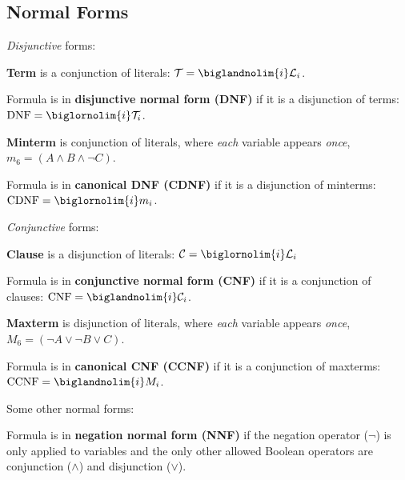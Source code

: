 \documentclass[a4paper,10pt]{article}
\begin{document}
\endgroup


\newpage
\subsection{Normal Forms}

\begin{terms}
    \item \emph{Disjunctive} forms:
    \begin{terms}
        \item \textbf{Term} is a conjunction of literals: $\mathcal{T} = \biglandnolim{i} \mathcal{L}_i$.

        \item Formula is in \textbf{disjunctive normal form (DNF)} if it is a disjunction of terms: $\textrm{DNF} = \biglornolim{i} \mathcal{T}_i$.

        \item \textbf{Minterm} is conjunction of literals, where \emph{each} variable appears \emph{once}, \eg $m_6 = (A \land B \land \neg C)$.

        \item Formula is in \textbf{canonical DNF (CDNF)} if it is a disjunction of minterms: $\textrm{CDNF} = \biglornolim{i} m_i$.
    \end{terms}

    \item \emph{Conjunctive} forms:
    \begin{terms}
        \item \textbf{Clause} is a disjunction of literals: $\mathcal{C} = \biglornolim{i} \mathcal{L}_i$

        \item Formula is in \textbf{conjunctive normal form (CNF)} if it is a conjunction of clauses: $\textrm{CNF} = \biglandnolim{i} \mathcal{C}_i$.

        \item \textbf{Maxterm} is disjunction of literals, where \emph{each} variable appears \emph{once}, \eg $M_6 = (\neg A \lor \neg B \lor C)$.

        \item Formula is in \textbf{canonical CNF (CCNF)} if it is a conjunction of maxterms: $\textrm{CCNF} = \biglandnolim{i} M_i$.
    \end{terms}

    \item Some other normal forms:
    \begin{terms}
        \item Formula is in \textbf{negation normal form (NNF)} if the negation operator ($\neg$) is only applied to variables and the only other allowed Boolean operators are conjunction ($\land$) and disjunction ($\lor$).


\end{terms}
\end{terms}
\end{document}
